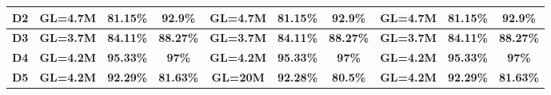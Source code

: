 \begin{table}
{\begin{tabular}{ |c|c|c|c|c|c|c|c|c|c| }
     					  \textbf{D2} & \textbf{GL=4.7M} & \textbf{81.15\%} & \textbf{92.9\%} & \textbf{GL=4.7M} & \textbf{81.15\%} & \textbf{92.9\%} & \textbf{GL=4.7M} & \textbf{81.15\%} & \textbf{92.9\%}
\\ \hline
     				 \textbf{D3}  & \textbf{GL=3.7M} & \textbf{84.11\%} & \textbf{88.27\%}  & \textbf{GL=3.7M} & \textbf{84.11\%} & \textbf{88.27\%} & \textbf{GL=3.7M} & \textbf{84.11\%} & \textbf{88.27\%}
\\ \hline                        
                         \textbf{D4} & \textbf{GL=4.2M} & \textbf{95.33\%} & \textbf{97\%} & \textbf{GL=4.2M} & \textbf{95.33\%} & \textbf{97\%} & \textbf{GL=4.2M} & \textbf{95.33\%} & \textbf{97\%}
\\ \hline                           
                         \textbf{D5} & \textbf{GL=4.2M} & \textbf{92.29\%} & \textbf{81.63\%} & \textbf{GL=20M} & \textbf{92.28\%} &  \textbf{80.5\%} & \textbf{GL=4.2M} & \textbf{92.29\%} & \textbf{81.63\%}
  \\ \hline 
  \end{tabular}}
\label{tb1:Lighter-Blue-Racer-Perplexity-vs-Alignment}
\end{table}
\vspace{-8pt}
\begin{comment}


\begin{table}[H]
\centering
\begin{tabular}{ |c|c|c| }
\hline
 Dataset & \makecell{Correlation \\ (N-Gram)} & \makecell{Correlation \\ (RNN)}\\ 
 \hline
 D1 &  -0.977 & -0.938 \\ 
 D2 &  -0.981 & -0.969 \\ 
 D3 &  -0.982 & -0.968 \\   
 D4 &  -0.946 & -0.930 \\
 D5 &  -0.970 & -0.962 \\
\hline
\end{tabular}
\caption {Correlation value between Perplexity of our proposed approaches and Overall Alignment Rate for our five data sets. This demonstrates the strong relationship between the Perplexity Metric and the Overall Alignment Rate.}
\label{tbl:Correlation_N_Gram}
\end{table}
\end{comment}

